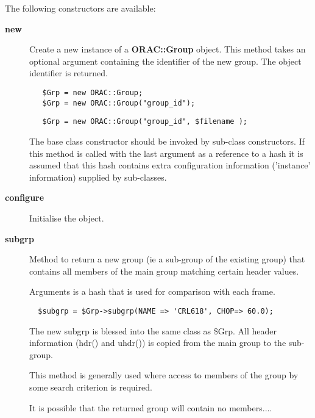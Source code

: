 \begin{description}
The following constructors are available:

\begin{description}

\item[{\textbf{new}}] \mbox{}

Create a new instance of a \textbf{ORAC::Group} object.
This method takes an optional argument containing the
identifier of the new group. The object identifier is returned.

\begin{verbatim}
   $Grp = new ORAC::Group;
   $Grp = new ORAC::Group("group_id");
\end{verbatim}
\begin{verbatim}
   $Grp = new ORAC::Group("group_id", $filename );
\end{verbatim}


The base class constructor should be invoked by sub-class constructors.
If this method is called with the last argument as a reference to
a hash it is assumed that this hash contains extra configuration
information ('instance' information) supplied by sub-classes.


\item[{\textbf{configure}}] \mbox{}

Initialise the object.


\item[{\textbf{subgrp}}] \mbox{}

Method to return a new group (ie a sub-group of the existing
group) that contains all members of the main group matching
certain header values.



Arguments is a hash that is used for comparison with each
frame.

\begin{verbatim}
  $subgrp = $Grp->subgrp(NAME => 'CRL618', CHOP=> 60.0);
\end{verbatim}


The new subgrp is blessed into the same class as \$Grp.
All header information (hdr() and uhdr()) is copied 
from the main group to the sub-group.



This method is generally used where access to members of the
group by some search criterion is required.



It is possible that the returned group will contain no 
members....




\end{description}
\end{description}

